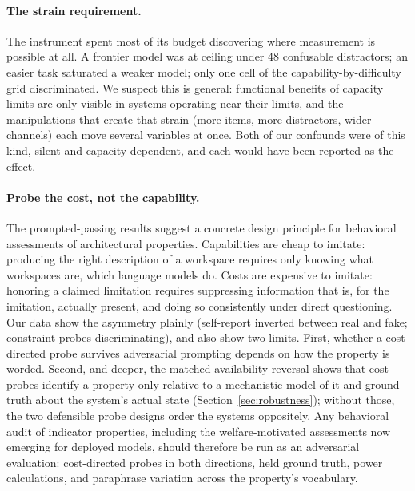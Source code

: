 \documentclass[11pt]{article}
\begin{document}
\paragraph{The strain requirement.} The instrument spent most of its budget
discovering where measurement is possible at all. A frontier model was at
ceiling under 48 confusable distractors; an easier task saturated a weaker
model; only one cell of the capability-by-difficulty grid discriminated. We
suspect this is general: functional benefits of capacity limits are only
visible in systems operating near their limits, and the manipulations that
create that strain (more items, more distractors, wider channels) each move
several variables at once. Both of our confounds were of this kind, silent and
capacity-dependent, and each would have been reported as the effect.

\paragraph{Probe the cost, not the capability.} The prompted-passing results
suggest a concrete design principle for behavioral assessments of architectural
properties. Capabilities are cheap to imitate: producing the right description
of a workspace requires only knowing what workspaces are, which language models
do. Costs are expensive to imitate: honoring a claimed limitation requires
suppressing information that is, for the imitation, actually present, and doing
so consistently under direct questioning. Our data show the asymmetry plainly
(self-report inverted between real and fake; constraint probes discriminating),
and also show two limits. First, whether a cost-directed probe survives
adversarial prompting depends on how the property is worded. Second, and
deeper, the matched-availability reversal shows that cost probes identify a
property only relative to a mechanistic model of it and ground truth about the
system's actual state (Section~\ref{sec:robustness}); without those, the two
defensible probe designs order the systems oppositely. Any behavioral audit of
indicator properties, including the welfare-motivated assessments now emerging
for deployed models, should therefore be run as an adversarial evaluation:
cost-directed probes in both directions, held ground truth, power calculations,
and paraphrase variation across the property's vocabulary.
\end{document}
